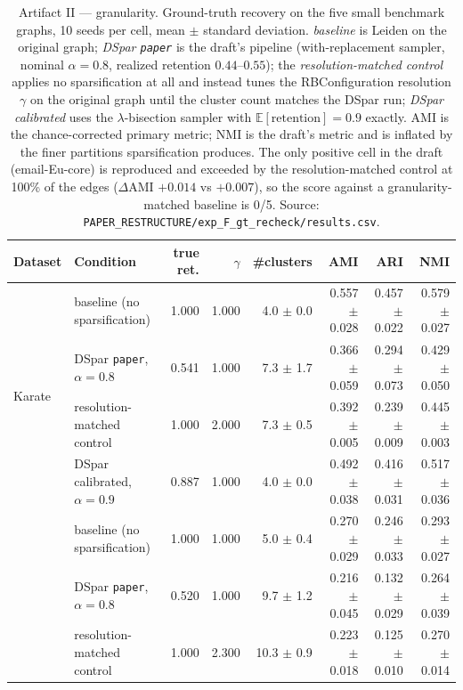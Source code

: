 \begin{table}[t]
\centering
\setlength{\tabcolsep}{5pt}
\caption{Artifact II --- granularity. Ground-truth recovery on the five small benchmark graphs,
10 seeds per cell, mean $\pm$ standard deviation. \emph{baseline} is Leiden on the original graph;
\emph{DSpar \texttt{paper}} is the draft's pipeline (with-replacement sampler, nominal $\alpha=0.8$,
realized retention $0.44$--$0.55$); the \emph{resolution-matched control} applies no sparsification
at all and instead tunes the RBConfiguration resolution $\gamma$ on the original graph until the
cluster count matches the DSpar run; \emph{DSpar calibrated} uses the $\lambda$-bisection sampler
with $\mathbb{E}[\text{retention}]=0.9$ exactly. AMI is the chance-corrected primary metric; NMI is
the draft's metric and is inflated by the finer partitions sparsification produces. The only
positive cell in the draft (email-Eu-core) is reproduced and exceeded by the resolution-matched
control at 100\% of the edges ($\Delta$AMI $+0.014$ vs $+0.007$), so the score against a
granularity-matched baseline is 0/5.
Source: \texttt{PAPER\_RESTRUCTURE/exp\_F\_gt\_recheck/results.csv}.}
\label{tab:gt_recheck}
\footnotesize
\begin{tabular}{llrrrrrr}
\toprule
Dataset & Condition & true ret. & $\gamma$ & \#clusters & AMI & ARI & NMI \\
\midrule
\multirow{4}{*}{Karate} & baseline (no sparsification) & 1.000 & 1.000 & 4.0 $\pm$ 0.0 & 0.557 $\pm$ 0.028 & 0.457 $\pm$ 0.022 & 0.579 $\pm$ 0.027 \\
 & DSpar \texttt{paper}, $\alpha=0.8$ & 0.541 & 1.000 & 7.3 $\pm$ 1.7 & 0.366 $\pm$ 0.059 & 0.294 $\pm$ 0.073 & 0.429 $\pm$ 0.050 \\
 & resolution-matched control & 1.000 & 2.000 & 7.3 $\pm$ 0.5 & 0.392 $\pm$ 0.005 & 0.239 $\pm$ 0.009 & 0.445 $\pm$ 0.003 \\
 & DSpar calibrated, $\alpha=0.9$ & 0.887 & 1.000 & 4.0 $\pm$ 0.0 & 0.492 $\pm$ 0.038 & 0.416 $\pm$ 0.031 & 0.517 $\pm$ 0.036 \\
\addlinespace[2pt]
\multirow{4}{*}{Dolphins$^{\dagger}$} & baseline (no sparsification) & 1.000 & 1.000 & 5.0 $\pm$ 0.4 & 0.270 $\pm$ 0.029 & 0.246 $\pm$ 0.033 & 0.293 $\pm$ 0.027 \\
 & DSpar \texttt{paper}, $\alpha=0.8$ & 0.520 & 1.000 & 9.7 $\pm$ 1.2 & 0.216 $\pm$ 0.045 & 0.132 $\pm$ 0.029 & 0.264 $\pm$ 0.039 \\
 & resolution-matched control & 1.000 & 2.300 & 10.3 $\pm$ 0.9 & 0.223 $\pm$ 0.018 & 0.125 $\pm$ 0.010 & 0.270 $\pm$ 0.014 \\

\end{tabular}
\end{table}
